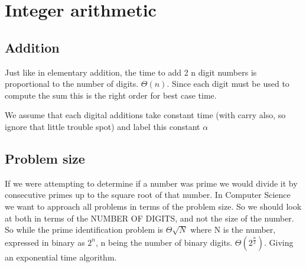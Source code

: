 \documentclass[english, 10pt]{article}
\begin{document}

\section{Integer arithmetic}
\subsection{Addition}
Just like in elementary addition, the time to add 2 n digit numbers is proportional to the number of digits. $\Theta(n)$.
Since each digit must be used to compute the sum this is the right order for best case time.

\begin{center}
\qquad
\end{center}

We assume that each digital additions take constant time (with carry also, so ignore that little trouble spot) and label this constant $\alpha$

\subsection{Problem size}

If we were attempting to determine if a number was prime we would divide it by consecutive primes up to the square root of that number.
In Computer Science we want to approach all problems in terms of the problem size. So we should look at both in terms of the NUMBER OF DIGITS,
and not the size of the number. So while the prime identification problem is $\Theta{\sqrt{N}}$ where N is the number,
expressed in binary as $2^n$, n being the number of binary digits. $\Theta(2^{\frac{n}{2}})$. Giving an exponential time algorithm.
\end{document}

